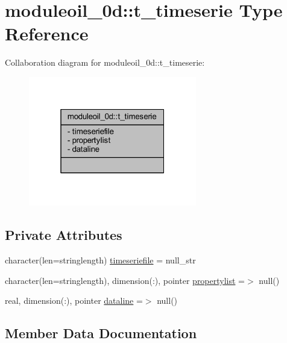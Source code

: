 \hypertarget{structmoduleoil__0d_1_1t__timeserie}{}\section{moduleoil\+\_\+0d\+:\+:t\+\_\+timeserie Type Reference}
\label{structmoduleoil__0d_1_1t__timeserie}


Collaboration diagram for moduleoil\+\_\+0d\+:\+:t\+\_\+timeserie\+:\nopagebreak
\begin{figure}[H]
\begin{center}
\leavevmode
\includegraphics[width=208pt]{structmoduleoil__0d_1_1t__timeserie__coll__graph}
\end{center}
\end{figure}
\subsection*{Private Attributes}
\begin{DoxyCompactItemize}
\item 
character(len=stringlength) \mbox{\hyperlink{structmoduleoil__0d_1_1t__timeserie_a5cf27f4a4f82cad8fa311a2effa49b8a}{timeseriefile}} = null\+\_\+str
\item 
character(len=stringlength), dimension(\+:), pointer \mbox{\hyperlink{structmoduleoil__0d_1_1t__timeserie_aaf840bb78b08a061819357dd85b0ca9e}{propertylist}} =$>$ null()
\item 
real, dimension(\+:), pointer \mbox{\hyperlink{structmoduleoil__0d_1_1t__timeserie_a806fbdcce9723383276cba3441a31bdf}{dataline}} =$>$ null()
\end{DoxyCompactItemize}


\subsection{Member Data Documentation}
\mbox{\label{structmoduleoil__0d_1_1t__timeserie_a806fbdcce9723383276cba3441a31bdf}} 
